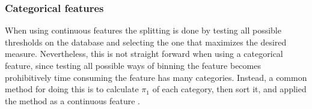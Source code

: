 
 
\subsubsection{Categorical features}
When using continuous features the splitting is done by testing all possible thresholds on the 
database and  selecting the one that maximizes the desired measure. Nevertheless, this is not 
straight forward when using a  categorical feature, since testing all possible ways of binning the 
feature becomes prohibitively time  consuming the feature has many categories. Instead, a common 
method for doing this is to calculate $\pi_1$ of each category, then sort it, and applied the 
method as a continuous feature \citep{Marslan2009}.



